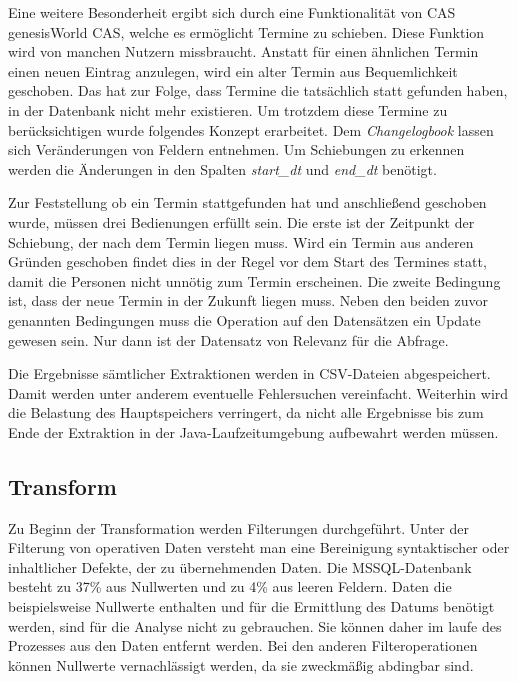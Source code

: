 Eine weitere Besonderheit ergibt sich durch eine Funktionalität von CAS genesisWorld CAS, welche es ermöglicht Termine zu schieben. Diese Funktion wird von manchen Nutzern missbraucht. Anstatt für einen ähnlichen Termin einen neuen Eintrag anzulegen, wird ein alter Termin aus Bequemlichkeit geschoben. Das hat zur Folge, dass Termine die tatsächlich statt gefunden haben, in der Datenbank nicht mehr existieren. Um trotzdem diese Termine zu berücksichtigen wurde folgendes Konzept erarbeitet. Dem \textit{Changelogbook} lassen sich Veränderungen von Feldern entnehmen. Um Schiebungen zu erkennen werden die Änderungen in den Spalten \textit{start\_dt} und \textit{end\_dt} benötigt. 

Zur Feststellung ob ein Termin stattgefunden hat und anschließend geschoben wurde, müssen drei Bedienungen erfüllt sein. Die erste ist der Zeitpunkt der Schiebung, der nach dem Termin liegen muss. Wird ein Termin aus anderen Gründen geschoben findet dies in der Regel vor dem Start des Termines statt, damit die Personen nicht unnötig zum Termin erscheinen. Die zweite Bedingung ist, dass der neue Termin in der Zukunft liegen muss. Neben den beiden zuvor genannten Bedingungen muss die Operation auf den Datensätzen ein Update gewesen sein. Nur dann ist der Datensatz von Relevanz für die Abfrage. 

Die Ergebnisse sämtlicher Extraktionen werden in CSV-Dateien abgespeichert. Damit werden unter anderem eventuelle Fehlersuchen vereinfacht. Weiterhin wird die Belastung des Hauptspeichers verringert, da nicht alle Ergebnisse bis zum Ende der Extraktion in der Java-Laufzeitumgebung aufbewahrt werden müssen.

\subsection{Transform}

Zu Beginn der Transformation werden Filterungen durchgeführt. Unter der Filterung von operativen Daten versteht man eine Bereinigung syntaktischer oder inhaltlicher Defekte, der zu übernehmenden Daten. Die MSSQL-Datenbank besteht zu 37\% aus Nullwerten und zu 4\% aus leeren Feldern. Daten die beispielsweise Nullwerte enthalten und für die Ermittlung des Datums benötigt werden, sind für die Analyse nicht zu gebrauchen. Sie können daher im laufe des Prozesses aus den Daten entfernt werden. Bei den anderen Filteroperationen können Nullwerte vernachlässigt werden, da sie zweckmäßig abdingbar sind.

